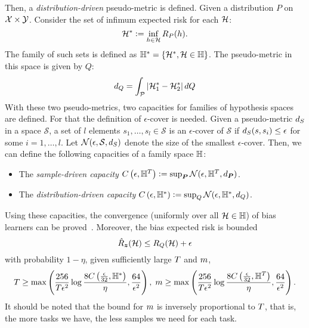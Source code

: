Then, a \emph{distribution-driven} pseudo-metric is defined. Given a distribution $P$ on $\mathcal{X} \times \mathcal{Y}$. Consider the set of infimum expected risk for each $\mathcal{H}$:
\begin{equation}
    \nonumber
    \mathcal{H}^* \vcentcolon= \inf_{h \in \mathcal{H}} R_P(h).
\end{equation}
The family of such sets is defined as 
$\mathbb{H}^{*} = \left\{\mathcal{H}^*, \mathcal{H} \in \mathbb{H}\right\}$.
The pseudo-metric in this space is given by $Q$:
\begin{equation}
    \nonumber
    d_{Q} = \int_{\mathcal{P}} \left|\mathcal{H}_1^* - \mathcal{H}_2^*\right| dQ
\end{equation}
With these two pseudo-metrics, two capacities for families of hypothesis spaces are defined. For that the definition of $\epsilon$-cover is needed. Given a pseudo-metric $d_{S}$ in a space $\mathcal{S}$, 
a set of $l$ elements $s_1, \ldots, s_l \in \mathcal{S}$ is an $\epsilon$-cover of $\mathcal{S}$ if 
$ d_{S}(s, s_i) \leq \epsilon $
for some $i=1, \ldots, l$.  Let $\mathcal{N}(\epsilon, \mathcal{S}, d_{S})$ denote the size of the smallest $\epsilon$-cover.
Then, we can define the following capacities of a family space $\mathbb{H}$:
\begin{itemize}
    \item The \emph{sample-driven capacity} $C\left(\epsilon, \mathbb{H}^{T}\right) \vcentcolon= \sup_{\bm{P}} \mathcal{N}(\epsilon, \mathbb{H}^T, d_{\bm{P}})$.
    \item The \emph{distribution-driven capacity} $C\left(\epsilon, \mathbb{H}^{*}\right) \vcentcolon= \sup_Q \mathcal{N}(\epsilon, \mathbb{H}^{*}, d_{Q})$.
\end{itemize}

Using these capacities, the convergence (uniformly over all $\mathcal{H} \in \mathbb{H}$) of bias learners can be proved~\cite[Theorem~2]{baxter2000model}. Moreover, the bias expected risk is bounded
\begin{equation}
    \nonumber
    \hat{R}_{\bm{z}}(\mathcal{H}) \leq R_Q(\mathcal{H}) + \epsilon
\end{equation}
with probability $1 - \eta$, given sufficiently large $T$ and $m$, 
\begin{equation}
    \nonumber
    T \geq \max \left( \frac{256}{T \epsilon^2} \log\frac{8C\left(\frac{\epsilon}{32}, \mathbb{H}^{*}\right)}{\eta} , \frac{64}{\epsilon^2}\right)  , \; m \geq \max \left( \frac{256}{T \epsilon^2} \log\frac{8C\left(\frac{\epsilon}{32}, \mathbb{H}^{T}\right)}{\eta} , \frac{64}{\epsilon^2}\right) .
\end{equation}
It should be noted that the bound for $m$ is inversely proportional to $T$, that is, the more tasks we have, the less samples we need for each task. 



